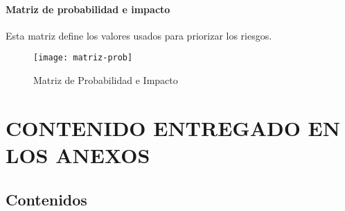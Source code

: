 \paragraph*{Matriz de probabilidad e impacto}
Esta matriz define los valores usados para priorizar los riesgos.
\begin{figure}[H]
\centering
\centerline{\texttt{[image: matriz-prob]}}
\caption{Matriz de Probabilidad e Impacto}
\end{figure}


\newpage
\section{CONTENIDO ENTREGADO EN LOS ANEXOS}\label{sec:contenido_anexos}

\subsection{Contenidos} 



